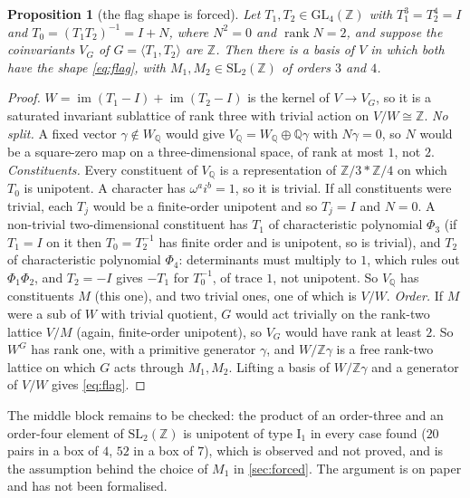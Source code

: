 \documentclass[11pt,a4paper]{article}
\newcommand{\ZZ}{\mathbb{Z}}
\newcommand{\QQ}{\mathbb{Q}}
\newcommand{\SL}{\mathrm{SL}}
\newcommand{\GL}{\mathrm{GL}}
\theoremstyle{plain}
\newtheorem{proposition}{Proposition}
\theoremstyle{definition}
\begin{document}
\begin{proposition}[the flag shape is forced]
\label{prop:flagforced}
Let $T_1,T_2\in\GL_4(\ZZ)$ with $T_1^3=T_2^4=I$ and $T_0=(T_1T_2)^{-1}=I+N$, where
$N^2=0$ and $\operatorname{rank}N=2$, and suppose the coinvariants $V_G$ of
$G=\langle T_1,T_2\rangle$ are $\ZZ$. Then there is a basis of $V$ in which both have
the shape \eqref{eq:flag}, with $M_1,M_2\in\SL_2(\ZZ)$ of orders $3$ and $4$.
\end{proposition}
\begin{proof}
$W=\operatorname{im}(T_1-I)+\operatorname{im}(T_2-I)$ is the kernel of $V\to V_G$, so it is a
saturated invariant sublattice of rank three with trivial action on $V/W\cong\ZZ$.
\emph{No split.} A fixed vector $\gamma\notin W_\QQ$ would give
$V_\QQ=W_\QQ\oplus\QQ\gamma$ with $N\gamma=0$, so $N$ would be a square-zero map on a
three-dimensional space, of rank at most $1$, not $2$.
\emph{Constituents.} Every constituent of $V_\QQ$ is a representation of
$\mathbb Z/3*\mathbb Z/4$ on which $T_0$ is unipotent. A character has
$\omega^ai^b=1$, so it is trivial. If all constituents were trivial, each $T_j$ would be a
finite-order unipotent and so $T_j=I$ and $N=0$. A non-trivial two-dimensional
constituent has $T_1$ of characteristic polynomial $\Phi_3$ (if $T_1=I$ on it then
$T_0=T_2^{-1}$ has finite order and is unipotent, so is trivial), and $T_2$ of
characteristic polynomial $\Phi_4$: determinants must multiply to $1$, which rules out
$\Phi_1\Phi_2$, and $T_2=-I$ gives $-T_1$ for $T_0^{-1}$, of trace $1$, not unipotent.
So $V_\QQ$ has constituents $M$ (this one), and two trivial ones, one of which is
$V/W$.
\emph{Order.} If $M$ were a sub of $W$ with trivial quotient, $G$ would act trivially on
the rank-two lattice $V/M$ (again, finite-order unipotent), so $V_G$ would have rank at
least $2$. So $W^G$ has rank one, with a primitive generator $\gamma$, and $W/\ZZ\gamma$ is a
free rank-two lattice on which $G$ acts through $M_1,M_2$. Lifting a basis of
$W/\ZZ\gamma$ and a generator of $V/W$ gives \eqref{eq:flag}.
\end{proof}
The middle block remains to be checked: the product of an order-three and an
order-four element of $\SL_2(\ZZ)$ is unipotent of type $\mathrm I_1$ in every case
found ($20$ pairs in a box of $4$, $52$ in a box of $7$), which is observed and not
proved, and is the assumption behind the choice of $M_1$ in \cref{sec:forced}. The
argument is on paper and has not been formalised.
\end{document}
